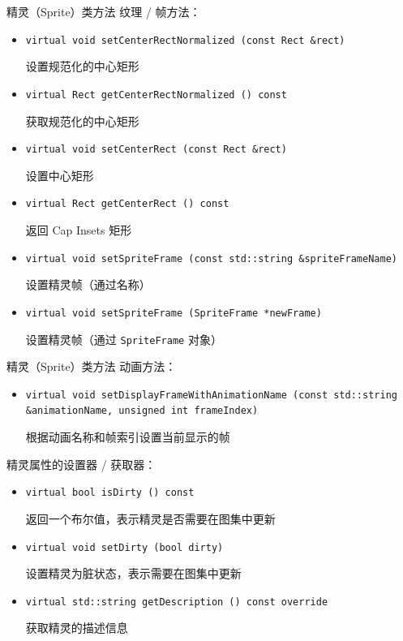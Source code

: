 \documentclass{beamer}
\begin{document}

\begin{frame}[fragile]{精灵（Sprite）类方法}
纹理 / 帧方法：
\begin{itemize}
\item \texttt{virtual void setCenterRectNormalized (const Rect \&rect)}

设置规范化的中心矩形
\item \texttt{virtual Rect getCenterRectNormalized () const}

获取规范化的中心矩形
\item \texttt{virtual void setCenterRect (const Rect \&rect)}

设置中心矩形
\item \texttt{virtual Rect getCenterRect () const}

返回 Cap Insets 矩形
\item \texttt{virtual void setSpriteFrame (const std::string \&spriteFrameName)}

设置精灵帧（通过名称）
\item \texttt{virtual void setSpriteFrame (SpriteFrame *newFrame)}

设置精灵帧（通过 \texttt{SpriteFrame} 对象）
\end{itemize}
\end{frame}


\begin{frame}[fragile]{精灵（Sprite）类方法}
动画方法：
\begin{itemize}
\item \texttt{virtual void setDisplayFrameWithAnimationName (const std::string \&animationName, unsigned int frameIndex)}

根据动画名称和帧索引设置当前显示的帧
\end{itemize}
精灵属性的设置器 / 获取器：
\begin{itemize}
\item \texttt{virtual bool isDirty () const}

返回一个布尔值，表示精灵是否需要在图集中更新
\item \texttt{virtual void setDirty (bool dirty)}

设置精灵为脏状态，表示需要在图集中更新
\item \texttt{virtual std::string getDescription () const override}

获取精灵的描述信息
\end{itemize}
\end{frame}
\end{document}
